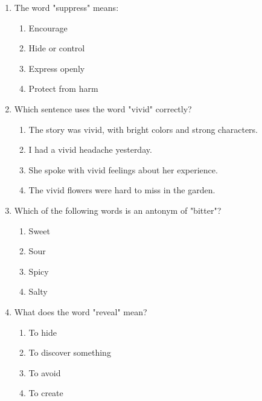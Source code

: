 \documentclass[12pt]{article}
\begin{document}
\begin{enumerate}
\vspace{0.5cm}

\item The word "suppress" means:
\begin{enumerate}[label=\Alph*.]
    \item Encourage
    \item Hide or control
    \item Express openly
    \item Protect from harm
\end{enumerate}

\vspace{0.5cm}

\item Which sentence uses the word "vivid" correctly?
\begin{enumerate}[label=\Alph*.]
    \item The story was vivid, with bright colors and strong characters.
    \item I had a vivid headache yesterday.
    \item She spoke with vivid feelings about her experience.
    \item The vivid flowers were hard to miss in the garden.
\end{enumerate}

\vspace{0.5cm}

\item Which of the following words is an antonym of "bitter"?
\begin{enumerate}[label=\Alph*.]
    \item Sweet
    \item Sour
    \item Spicy
    \item Salty
\end{enumerate}

\vspace{0.5cm}

\item What does the word "reveal" mean?
\begin{enumerate}[label=\Alph*.]
    \item To hide
    \item To discover something
    \item To avoid
    \item To create
\end{enumerate}

\vspace{0.5cm}


\end{enumerate}
\end{document}
